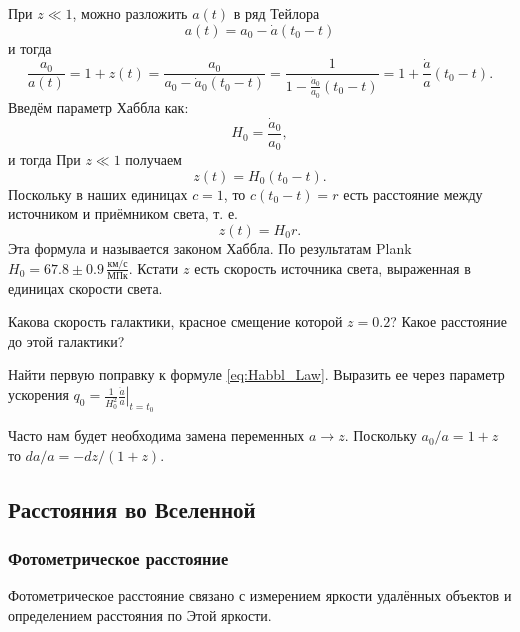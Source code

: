 \documentclass[]{article}
\begin{document}
При $z \ll 1$, можно разложить $a(t)$ в ряд Тейлора
\begin{equation*}\label{}
	a(t) = a_0 - \dot{a} (t_0 - t)
\end{equation*}
и тогда
\begin{equation*}\label{}
	\frac{a_0}{a(t)} = 1 + z(t) = \frac{a_0}{a_0 - \dot{a}_0 (t_0 - t)} = \frac{1}{1 - \frac{\dot{a}_0}{a_0}(t_0 - t)} = 1 +  \frac{\dot{a}}{a}(t_0 - t).
\end{equation*}
Введём параметр Хаббла как:
\begin{equation}\label{eq:H}
	H_0 = \frac{\dot{a}_0}{a_0},
\end{equation}
и тогда При $z \ll 1$ получаем
\begin{equation}\label{eq:low_z}
	z(t) = H_0(t_0 - t).
\end{equation}
Поскольку в наших единицах $c = 1$, то $c(t_0 - t) = r$ есть расстояние между источником и приёмником света, т. е.
\begin{equation}\label{eq:Habbl_Law}
	z(t) = H_0r.
\end{equation}
Эта формула и называется законом Хаббла. По результатам Plank $H_0 = 67.8 \pm 0.9\, \frac{\text{км/с}}{\text{МПк}}$.
Кстати $z$ есть скорость источника света, выраженная в единицах скорости света.

\begin{tcolorbox}
	Какова скорость галактики, красное смещение которой $z = 0.2$? Какое расстояние до этой галактики?
\end{tcolorbox}

\begin{tcolorbox}
	Найти первую поправку к формуле \eqref{eq:Habbl_Law}. Выразить ее через параметр ускорения $q_0 = \frac{1}{H_0^2} \left. \frac{\ddot{a}}{a} \right|_{t = t_0} $
\end{tcolorbox}

\begin{tcolorbox}[title = Замена переменных $a \to z$. Бокс \ref{box:az}]\label{box:az}
Часто нам будет необходима замена переменных $a \to z$.
Поскольку $a_0/a = 1 + z$ то $da/a = -dz/(1+z)$.
\end{tcolorbox}
\subsection{Расстояния во Вселенной}

\subsubsection{Фотометрическое расстояние}
Фотометрическое расстояние связано с измерением яркости удалённых объектов и определением расстояния по Этой яркости.
\end{document}
